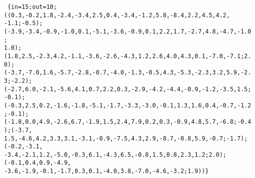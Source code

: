 \texttt{
\{in=15;out=10;((0.3,-0.2,1.8,-2.4,-3.4,2.5,0.4,-3.4,-1.2,5.8,-8.4,2.2,4.5,4.2,\\
-1.1;-0.5);(-3.9,-3.4,-0.9,-1.0,0.1,-5.1,-3.6,-0.9,0.1,2.2,1.7,-2.7,4.8,-4.7,-1.0;\\
1.0);(1.8,2.5,-2.3,4.2,-1.1,-3.6,-2.6,-4.3,1.2,2.6,4.0,4.3,0.1,-7.0,-7.1;2.0);\\
(-3.7,-7.0,1.6,-5.7,-2.8,-0.7,-4.0,-1.3,-0.5,4.3,-5.3,-2.3,3.2,5.9,-2.3;-2.2);\\
(-2.7,6.0,-2.1,-5.6,4.1,0.7,2.2,0.3,-2.9,-4.2,-4.4,-0.9,-1.2,-3.5,1.5;-0.1);\\
(-0.3,2.5,0.2,-1.6,-1.8,-5.1,-1.7,-3.3,-3.0,-0.1,1.3,1.6,0.4,-0.7,-1.2;-0.1);\\
(-1.8,0.0,4.9,-2.6,6.7,-1.9,1.5,2.4,7.9,0.2,0.3,-0.9,4.8,5.7,-6.8;-0.4);(-3.7,\\
1.5,-4.6,4.2,3.3,3.1,-3.1,-0.9,-7.5,4.3,2.9,-8.7,-0.8,5.9,-0.7;-1.7);(-0.2,-3.1,\\
-3.4,-2.1,1.2,-5.0,-0.3,6.1,-4.3,6.5,-0.8,1.5,0.8,2.3,1.2;2.0);(-0.1,0.4,0.9,-4.9,\\
-3.6,-1.9,-0.1,-1.7,0.3,0.1,-4.0,3.8,-7.0,-4.6,-3.2;1.9))\}\\
}

